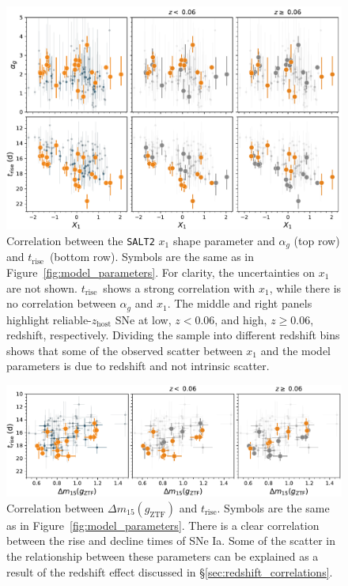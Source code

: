 \documentclass[twocolumn]{aastex63}
\newcommand{\trise}{$t_\mathrm{rise}$}
\begin{document}
\begin{figure}
    \centering
    \includegraphics[width=6in]{./figures/shape_correlations.pdf}
    \caption{Correlation between the \texttt{SALT2} $x_1$ shape parameter and
    $\alpha_g$ (top row) and \trise\ (bottom row). Symbols are the same as in
    Figure~\ref{fig:model_parameters}. For clarity, the uncertainties on $x_1$
    are not shown. \trise\ shows a strong correlation with $x_1$, while there is
    no correlation between $\alpha_g$ and $x_1$. The middle and right panels
    highlight reliable-$z_\mathrm{host}$ SNe at low, $z < 0.06$, and high, $z
    \ge 0.06$, redshift, respectively. Dividing the sample into different
    redshift bins shows that some of the observed scatter between $x_1$ and the
    model parameters is due to redshift and not intrinsic scatter. }
    \label{fig:shape_correlations}
\end{figure}

\begin{figure}
    \centering
    \includegraphics[width=6in]{./figures/dm15_rise.pdf}
    \caption{Correlation between $\Delta m_{15}(g_\mathrm{ZTF})$ and \trise.
    Symbols are the same as in Figure~\ref{fig:model_parameters}. There is a
    clear correlation between the rise and decline times of SNe Ia. Some of the
    scatter in the relationship between these parameters can be explained as a
    result of the redshift effect discussed in
    \S\ref{sec:redshift_correlations}.}
    \label{fig:dm15}
\end{figure}
\end{document}
